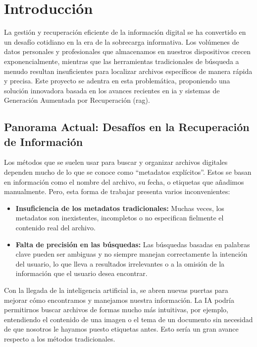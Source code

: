 
\chapter{Introducción}

La gestión y recuperación eficiente de la información digital se ha convertido en un desafío cotidiano en la era de la sobrecarga informativa. Los volúmenes de datos personales y profesionales que almacenamos en nuestros dispositivos crecen exponencialmente, mientras que las herramientas tradicionales de búsqueda a menudo resultan insuficientes para localizar archivos específicos de manera rápida y precisa. Este proyecto se adentra en esta problemática, proponiendo una solución innovadora basada en los avances recientes en \gls{ia} y sistemas de Generación Aumentada por Recuperación (\gls{rag}). \citep{thomas_janssen_build_2024}

\section{Panorama Actual: Desafíos en la Recuperación de Información}
Los métodos que se suelen usar para buscar y organizar archivos digitales dependen mucho de lo que se conoce como ``metadatos explícitos''. Estos se basan en información como el nombre del archivo, su fecha, o etiquetas que añadimos manualmente. Pero, esta forma de trabajar presenta varios inconvenientes:
\begin{itemize}
    \item \textbf{Insuficiencia de los metadatos tradicionales:} Muchas veces, los metadatos son inexistentes, incompletos o no especifican fielmente el contenido real del archivo.
    \item \textbf{Falta de precisión en las búsquedas:} Las búsquedas basadas en palabras clave pueden ser ambiguas y no siempre manejan correctamente la intención del usuario, lo que lleva a resultados irrelevantes o a la omisión de la información que el usuario desea encontrar.
\end{itemize}
Con la llegada de la inteligencia artificial \gls{ia}, se abren nuevas puertas para mejorar cómo encontramos y manejamos nuestra información. La IA podría permitirnos buscar archivos de formas mucho más intuitivas, por ejemplo, entendiendo el contenido de una imagen o el tema de un documento sin necesidad de que nosotros le hayamos puesto etiquetas antes. Esto sería un gran avance respecto a los métodos tradicionales.

